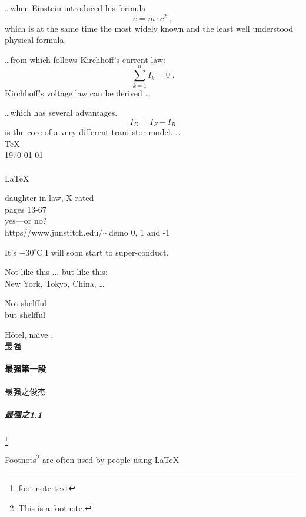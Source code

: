 \documentclass[a4paper, 11pt]{article}
\begin{document}
\ldots when Einstein introduced his formula
\begin{equation}
e = m \cdot c^2 \; ,
\end{equation}
which is at the same time the most widely known
and the least well understood physical formula.


\ldots from which follows Kirchhoff’s current law:
\begin{equation}
\sum_{k=1}^{n} I_k = 0 \; .
\end{equation}
Kirchhoff’s  voltage law can be derived \ldots

\sloppy

\newpage

\ldots which has several advantages.
\begin{equation}
I_D = I_F - I_R
\end{equation}
is the core of a very different transistor model. \ldots
\\
\TeX \\ \today \\ \LaTeXe \\
\LaTeX

daughter-in-law, X-rated\\
pages 13-67\\
yes---or no? \\
https//www.junstitch.edu/$\sim$demo
$0$, $1$ and -1

It's $-30 ^{\circ}\mathrm{C}$
I will soon start to super-conduct.

Not like this ... but like this:\\ New York, Tokyo, China, \ldots

Not shelfful \\ but shelf\mbox{}ful

H\^otel, na\"\i ve ,\\最强
\paragraph{最强第一段}
最强之俊杰
\subparagraph{最强之1.1}

\footnote{foot note text}

Footnots\footnote{This is a footnote.} are often used by people using \LaTeX
\end{document}
